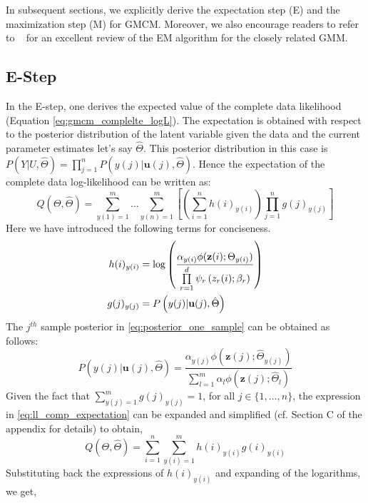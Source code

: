 \documentclass[]{article}
\begin{document}
In subsequent sections, we explicitly derive the expectation step (E) and the maximization step (M) for GMCM. Moreover, we also encourage readers to refer to ~\cite{Bilmes98agentle} for an excellent review of the EM algorithm for the closely related GMM.

\subsection{E-Step}
In the E-step, one derives the expected value of the complete data likelihood (Equation \ref{eq:gmcm_complelte_logL}). The expectation is obtained with respect to the posterior distribution of the latent variable given the data and the current parameter estimates let's say $\hat{\Theta}$. This posterior distribution in this case is $P(Y|U,\hat{\Theta}) = \prod\limits_{j=1}^{n}P\left(y(j)|\textbf{u}(j),\hat{\Theta} \right)$. Hence the expectation of the complete data log-likelihood can be written as:
\begin{equation} \label{eq:ll_comp_expectation}
Q(\Theta,\hat{\Theta})=\sum\limits_{y(1)=1}^m \ldots \sum\limits_{y(n)=1}^m \left[ \left( \sum\limits_{i=1}^{n}h(i)_{y(i)}  \right) \prod\limits_{j=1}^{n}g(j)_{y(j)} \right]
\end{equation}
Here we have introduced the following terms for conciseness.
\begin{align}
h(i)_{y(i)} &= \log \left(\frac{\alpha_{y(i)}\phi(\textbf{z}({i}); \Theta_{y(i)})}{\prod\limits_{r=1}^{d}\psi_{r}\left(z_r({i});\beta_r \right)} \right) \\
g(j)_{y(j)} &= P\left(y(j)|\textbf{u}(j),\hat{\Theta}\right) \label{eq:posterior_one_sample}
\end{align} 
The $j^{th}$ sample posterior in \eqref{eq:posterior_one_sample} can be obtained as follows:
\begin{equation}
P\left(y(j)|\textbf{u}(j),\hat{\Theta}\right) = \frac{\alpha_{y(j)}\phi(\textbf{z}(j);\hat{\Theta}_{y(j)})}{\sum\limits_{l=1}^{m}\alpha_l\phi(\textbf{z}(j);\hat{\Theta}_l)}
\end{equation}
Given the fact that $\sum\limits_{y(j)=1}^m g(j)_{y(j)} = 1$, for all  $j \in \{1,\ldots,n\}$, the expression in \eqref{eq:ll_comp_expectation} can be expanded and simplified (cf. Section C of the appendix for details) to obtain,
\begin{equation}
Q(\Theta,\hat{\Theta}) = \sum\limits_{i=1}^{n}\sum\limits_{y(i)=1}^m h(i)_{y(i)}g(i)_{y(i)}
\end{equation}
Substituting  back the expressions of $h(i)_{y(i)}$  and expanding of the logarithms, we get,
\end{document}
